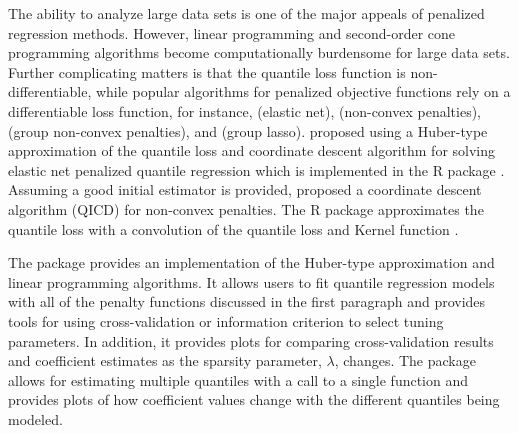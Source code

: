 The ability to analyze large data sets is one of the major appeals of penalized regression methods. However, linear programming and second-order cone programming algorithms become computationally burdensome for large data sets. Further complicating matters is that the quantile loss function is non-differentiable, while popular algorithms for penalized objective functions rely on a differentiable loss function, for instance, \cite{friedman2009glmnet} (elastic net), \cite{scadAlg} (non-convex penalties), \cite{brehenyglasso} (group non-convex penalties), and \cite{Yang2015} (group lasso). \cite{huber_cd} proposed using a Huber-type approximation of the quantile loss and coordinate descent algorithm for solving elastic net penalized quantile regression which is implemented in the R package . Assuming a good initial estimator is provided, \cite{qr_cd} proposed a coordinate descent algorithm (QICD) for non-convex penalties. The R package  approximates the quantile loss with a convolution of the quantile loss and Kernel function \citep{lowdConv,highdConv}.

The package  provides an implementation of the Huber-type approximation and linear programming algorithms. It allows users to fit quantile regression models with all of the penalty functions discussed in the first paragraph and provides tools for using cross-validation or information criterion to select tuning parameters. In addition, it provides plots for comparing cross-validation results and coefficient estimates as the sparsity parameter, \(\lambda\), changes. The package allows for estimating multiple quantiles with a call to a single function and provides plots of how coefficient values change with the different quantiles being modeled.

